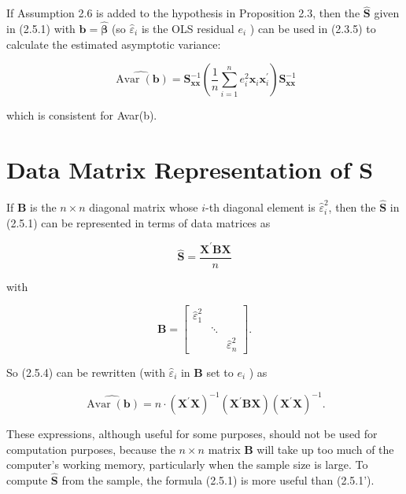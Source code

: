 \documentclass[10pt]{article}
\begin{document}
If Assumption 2.6 is added to the hypothesis in Proposition 2.3, then the $\widehat{\mathbf{S}}$ given in (2.5.1) with $\mathbf{b}=\widehat{\boldsymbol{\beta}}$ (so $\hat{\varepsilon}_{i}$ is the OLS residual $e_{i}$ ) can be used in (2.3.5) to calculate the estimated asymptotic variance:


\begin{equation*}
\widehat{\operatorname{Avar}(\mathbf{b})}=\mathbf{S}_{\mathbf{x x}}^{-1}\left(\frac{1}{n} \sum_{i=1}^{n} e_{i}^{2} \mathbf{x}_{i} \mathbf{x}_{i}^{\prime}\right) \mathbf{S}_{\mathbf{x x}}^{-1} \tag{2.5.4}
\end{equation*}


which is consistent for Avar(b).

\section*{Data Matrix Representation of $\mathbf{S}$}
If $\mathbf{B}$ is the $n \times n$ diagonal matrix whose $i$-th diagonal element is $\hat{\varepsilon}_{i}^{2}$, then the $\widehat{\mathbf{S}}$ in (2.5.1) can be represented in terms of data matrices as


\begin{equation*}
\widehat{\mathbf{S}}=\frac{\mathbf{X}^{\prime} \mathbf{B X}}{n} \tag{$\prime$}
\end{equation*}


with

$$
\mathbf{B}=\left[\begin{array}{ccc}
\hat{\varepsilon}_{1}^{2} & & \\
& \ddots & \\
& & \hat{\varepsilon}_{n}^{2}
\end{array}\right] .
$$

So (2.5.4) can be rewritten (with $\hat{\varepsilon}_{i}$ in $\mathbf{B}$ set to $e_{i}$ ) as


\begin{equation*}
\widehat{\operatorname{Avar}(\mathbf{b})}=n \cdot\left(\mathbf{X}^{\prime} \mathbf{X}\right)^{-1}\left(\mathbf{X}^{\prime} \mathbf{B X}\right)\left(\mathbf{X}^{\prime} \mathbf{X}\right)^{-1} . \tag{$\prime$}
\end{equation*}


These expressions, although useful for some purposes, should not be used for computation purposes, because the $n \times n$ matrix $\mathbf{B}$ will take up too much of the computer's working memory, particularly when the sample size is large. To compute $\widehat{\mathbf{S}}$ from the sample, the formula (2.5.1) is more useful than (2.5.1').
\end{document}
